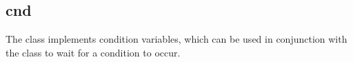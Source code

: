 %
%
%
%
%

\subsection{cnd}
\label{cnd}

The  class implements condition variables, which can be used in
conjunction with the  class to wait for a
condition to occur.

